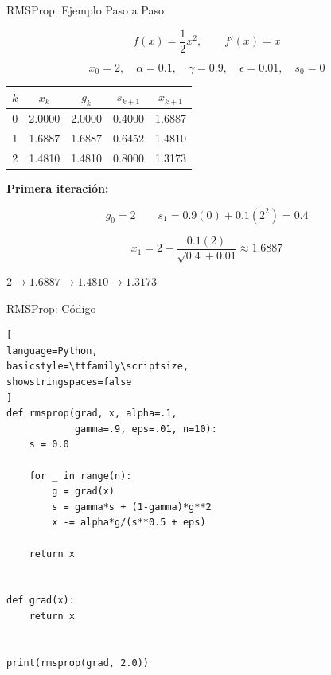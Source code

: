 \begin{frame}{RMSProp: Ejemplo Paso a Paso}

\small

\[
f(x)=\frac12x^2,
\qquad
f'(x)=x
\]

\[
x_0=2,\quad
\alpha=0.1,\quad
\gamma=0.9,\quad
\epsilon=0.01,\quad
s_0=0
\]

\vspace{0.15cm}

\begin{center}
\scriptsize
\begin{tabular}{c|c|c|c|c}
\toprule
$k$ & $x_k$ & $g_k$ & $s_{k+1}$ & $x_{k+1}$ \\
\midrule
0 & 2.0000 & 2.0000 & 0.4000 & 1.6887 \\
1 & 1.6887 & 1.6887 & 0.6452 & 1.4810 \\
2 & 1.4810 & 1.4810 & 0.8000 & 1.3173 \\
\bottomrule
\end{tabular}
\end{center}

\vspace{0.2cm}

\footnotesize
\textbf{Primera iteración:}

\[
g_0=2
\qquad
s_1=0.9(0)+0.1(2^2)=0.4
\]

\[
x_1
=
2-\frac{0.1(2)}
{\sqrt{0.4}+0.01}
\approx1.6887
\]

\begin{center}
\textcolor{VerdeNeon}{
$2\rightarrow1.6887\rightarrow1.4810\rightarrow1.3173$
}
\end{center}

\end{frame}


\begin{frame}[fragile]{RMSProp: Código}

\begin{lstlisting}[
language=Python,
basicstyle=\ttfamily\scriptsize,
showstringspaces=false
]
def rmsprop(grad, x, alpha=.1,
            gamma=.9, eps=.01, n=10):
    s = 0.0

    for _ in range(n):
        g = grad(x)
        s = gamma*s + (1-gamma)*g**2
        x -= alpha*g/(s**0.5 + eps)

    return x


def grad(x):
    return x


print(rmsprop(grad, 2.0))
\end{lstlisting}

\end{frame}